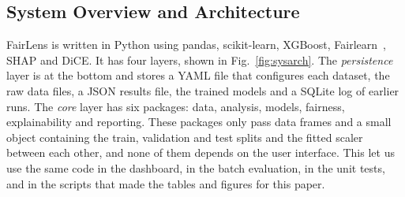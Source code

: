 \documentclass[conference]{IEEEtran}
\begin{document}
\subsection{System Overview and Architecture}
FairLens is written in Python using pandas, scikit-learn, XGBoost, Fairlearn~\cite{bird2020fairlearn}, SHAP and DiCE. It has four layers, shown in Fig.~\ref{fig:sysarch}. The \emph{persistence} layer is at the bottom and stores a YAML file that configures each dataset, the raw data files, a JSON results file, the trained models and a SQLite log of earlier runs. The \emph{core} layer has six packages: data, analysis, models, fairness, explainability and reporting. These packages only pass data frames and a small object containing the train, validation and test splits and the fitted scaler between each other, and none of them depends on the user interface. This let us use the same code in the dashboard, in the batch evaluation, in the unit tests, and in the scripts that made the tables and figures for this paper.
\end{document}
